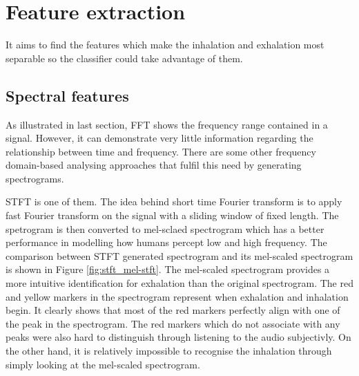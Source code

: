 \section{Feature extraction}
It aims to find the features which make the inhalation and exhalation most separable so the classifier could take advantage of them. 

\subsection{Spectral features}
As illustrated in last section, FFT shows the frequency range contained in a signal. However, it can demonstrate very little information regarding the relationship between time and frequency. There are some other frequency domain-based analysing approaches that fulfil this need by generating spectrograms. 

STFT is one of them. The idea behind short time Fourier transform is to apply fast Fourier transform on the signal with a sliding window of fixed length. The spetrogram is then converted to mel-sclaed spectrogram which has a better performance in modelling how humans percept low and high frequency. The comparison between STFT generated spectrogram and its mel-scaled spectrogram is shown in Figure \ref{fig:stft_mel-stft}. The mel-scaled spectrogram provides a more intuitive identification for exhalation than the original spectrogram. The red and yellow markers in the spectrogram represent when exhalation and inhalation begin. It clearly shows that most of the red markers perfectly align with one of the peak in the spectrogram. The red markers which do not associate with any peaks were also hard to distinguish through listening to the audio subjectivly. On the other hand, it is relatively impossible to recognise the inhalation through simply looking at the mel-scaled spectrogram.


